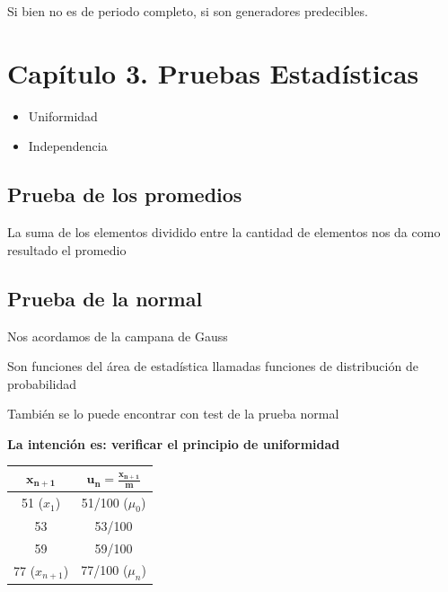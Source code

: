 \documentclass[11pt,letterpaper]{report}
\begin{document}
Si bien no es de periodo completo, si son generadores predecibles.

\section*{Capítulo 3. Pruebas Estadísticas}

\begin{itemize}
\item Uniformidad
\item Independencia
\end{itemize}

\subsection*{Prueba de los promedios}

La suma de los elementos dividido entre la cantidad de elementos nos da como resultado el promedio

\subsection*{Prueba de la normal}

Nos acordamos de la campana de Gauss

Son funciones del área de estadística llamadas funciones de distribución de probabilidad

También se lo puede encontrar con test de la prueba normal

\begin{center}
\textbf{La intención es: verificar el principio de uniformidad}
\end{center}

\begin{table}[H]
\centering
\begin{tabular}{|c|c|}
\hline
$\boldsymbol{x_{n+1}}$ & $\boldsymbol{u_n = \frac{x_{n+1}}{m}}$\\
\hline
51 ($x_1$) & 51/100 ($\mu_0$)\\
53 & 53/100\\
59 & 59/100\\
77 ($x_{n+1}$) & 77/100 ($\mu_n$)\\
\hline
\end{tabular}
\end{table}

\begin{center}
\end{center}
\end{document}
